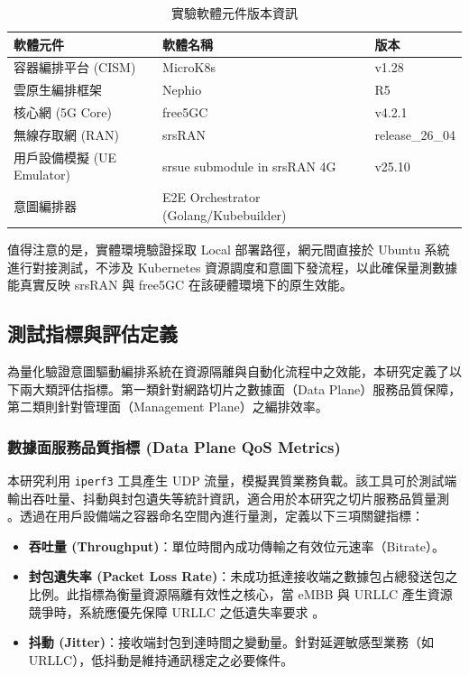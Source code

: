 \begin{table}[htbp]
    \centering
    \caption{實驗軟體元件版本資訊}
    \label{tab:software_versions}
    \begin{tabular}{|l|l|l|}
    \hline
    \textbf{軟體元件} & \textbf{軟體名稱} & \textbf{版本}\\ \hline
    容器編排平台 (CISM) & MicroK8s & v1.28\\ \hline
    雲原生編排框架 & Nephio & R5 \\ \hline
    核心網 (5G Core) & free5GC & v4.2.1 \\ \hline
    無線存取網 (RAN) & srsRAN & release\_26\_04 \\ \hline
    用戶設備模擬 (UE Emulator) & srsue submodule in srsRAN 4G & v25.10 \\ \hline
    意圖編排器 & E2E Orchestrator (Golang/Kubebuilder) & \\ \hline
    \end{tabular}
\end{table}

值得注意的是，實體環境驗證採取 Local 部署路徑，網元間直接於 Ubuntu 系統進行對接測試，不涉及 Kubernetes 資源調度和意圖下發流程，以此確保量測數據能真實反映 srsRAN 與 free5GC 在該硬體環境下的原生效能。

\subsection{測試指標與評估定義}
\label{subsec:metrics_definition}

為量化驗證意圖驅動編排系統在資源隔離與自動化流程中之效能，本研究定義了以下兩大類評估指標。第一類針對網路切片之數據面（Data Plane）服務品質保障，第二類則針對管理面（Management Plane）之編排效率。

\subsubsection{數據面服務品質指標 (Data Plane QoS Metrics)}
本研究利用 \texttt{iperf3} 工具產生 UDP 流量，模擬異質業務負載。該工具可於測試端輸出吞吐量、抖動與封包遺失等統計資訊，適合用於本研究之切片服務品質量測 \cite{iperf3_manual}。透過在用戶設備端之容器命名空間內進行量測，定義以下三項關鍵指標：
\begin{itemize}
    \item \textbf{吞吐量 (Throughput)}：單位時間內成功傳輸之有效位元速率（Bitrate）。
    \item \textbf{封包遺失率 (Packet Loss Rate)}：未成功抵達接收端之數據包占總發送包之比例。此指標為衡量資源隔離有效性之核心，當 eMBB 與 URLLC 產生資源競爭時，系統應優先保障 URLLC 之低遺失率要求 。
    \item \textbf{抖動 (Jitter)}：接收端封包到達時間之變動量。針對延遲敏感型業務（如 URLLC），低抖動是維持通訊穩定之必要條件。
\end{itemize}

